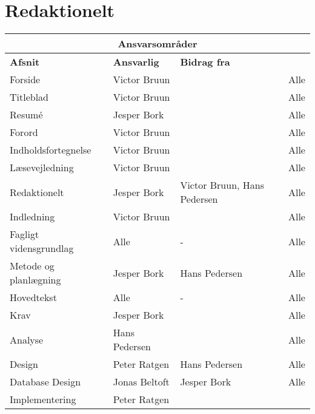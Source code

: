 \clearpage
\section{Redaktionelt}
\vfuzz=100pt
\hfuzz=100pt

\begin{table}[h!]
\centering
\label{tab:1}
    \begin{tabular}{|p{45mm}|p{30mm}|p{26mm}|p{26mm}|} \hline
    \multicolumn{4}{|c|}{\textbf{Ansvarsområder}} \\ \hline
        \textbf{Afsnit}        & \textbf{Ansvarlig} & \textbf{Bidrag fra} &\textbf{\raggedright Kontrolleret af}  \\\hline
        Forside                & Victor Bruun     &          & Alle \\ \hline
        Titleblad              & Victor Bruun     &          & Alle \\ \hline
        Resumé                 & Jesper Bork      &          & Alle  \\ \hline
        Forord                 & Victor Bruun     &          & Alle  \\ \hline
        Indholdsfortegnelse    & Victor Bruun     &          & Alle \\ \hline
        Læsevejledning         & Victor Bruun     &          & Alle  \\ \hline
        Redaktionelt           & Jesper Bork      & Victor Bruun, Hans Pedersen         & Alle \\ \hline
        Indledning             & Victor Bruun     &          & Alle \\ \hline
        Fagligt vidensgrundlag & Alle             & -        & Alle \\ \hline
        Metode og planlægning  & Jesper Bork      & Hans Pedersen         & Alle \\ \hline
        Hovedtekst             & Alle             & -        & Alle  \\ \hline
        Krav                   & Jesper Bork      &          & Alle \\ \hline
        Analyse                & Hans Pedersen    &              & Alle \\ \hline
        Design                 & Peter Ratgen     & Hans Pedersen& Alle \\ \hline
        Database Design        & Jonas Beltoft    & Jesper Bork  & Alle \\ \hline
        Implementering         & Peter Ratgen \newline 

\end{tabular}
\end{table}
